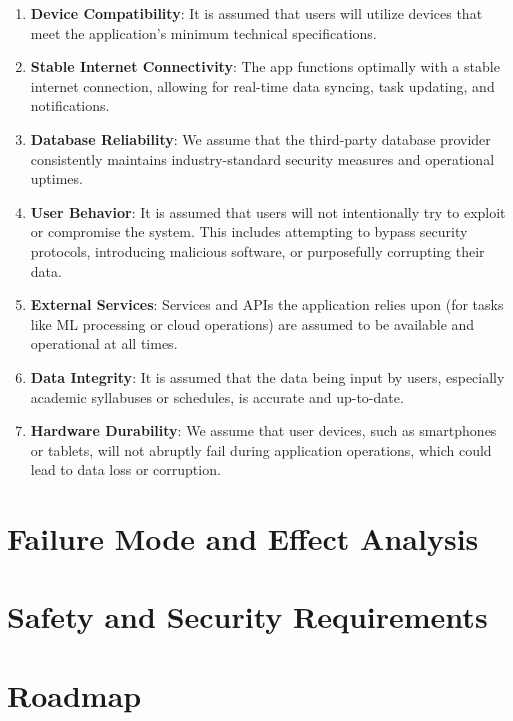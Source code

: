 \documentclass{article}
\begin{document}
\begin{enumerate}
    \item \textbf{Device Compatibility}: It is assumed that users will utilize devices that meet the application's minimum technical specifications.
    \item \textbf{Stable Internet Connectivity}: The app functions optimally with a stable internet connection, allowing for real-time data syncing, task updating, and notifications.
    \item \textbf{Database Reliability}: We assume that the third-party database provider consistently maintains industry-standard security measures and operational uptimes.
    \item \textbf{User Behavior}: It is assumed that users will not intentionally try to exploit or compromise the system. This includes attempting to bypass security protocols, introducing malicious software, or purposefully corrupting their data.
    \item \textbf{External Services}: Services and APIs the application relies upon (for tasks like ML processing or cloud operations) are assumed to be available and operational at all times.
    \item \textbf{Data Integrity}: It is assumed that the data being input by users, especially academic syllabuses or schedules, is accurate and up-to-date.
    \item \textbf{Hardware Durability}: We assume that user devices, such as smartphones or tablets, will not abruptly fail during application operations, which could lead to data loss or corruption.
\end{enumerate}

\section{Failure Mode and Effect Analysis}


\section{Safety and Security Requirements}


\section{Roadmap}
\end{document}
